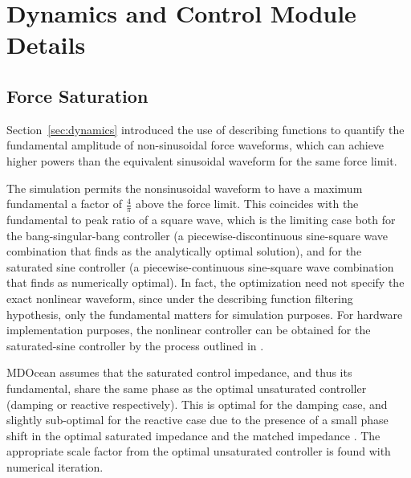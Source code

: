 \clearpage
\section{Dynamics and Control Module Details}

\subsection{Force Saturation}\label{sec:appendix-force-sat}
Section~\ref{sec:dynamics} introduced the use of describing functions to quantify the fundamental amplitude of non-sinusoidal force waveforms, which can achieve higher powers than the equivalent sinusoidal waveform for the same force limit.

The simulation permits the nonsinusoidal waveform to have a maximum fundamental a factor of $\frac{4}{\pi}$ above the force limit.
This coincides with the fundamental to peak ratio of a square wave, which is the limiting case both for the bang-singular-bang controller (a piecewise-discontinuous sine-square wave combination that \cite{hendrikx_optimal_2017} finds as the analytically optimal solution), and for the saturated sine controller (a piecewise-continuous sine-square wave combination that \cite{coe_initial_2020} finds as numerically optimal).
In fact, the optimization need not specify the exact nonlinear waveform, since under the describing function filtering hypothesis, only the fundamental matters for simulation purposes.
For hardware implementation purposes, the nonlinear controller can be obtained for the saturated-sine controller by the process outlined in \cite{mccabe_force-limited_2024}. 

MDOcean assumes that the saturated control impedance, and thus its fundamental, share the same phase as the optimal unsaturated controller (damping or reactive respectively).
This is optimal for the damping case, and slightly sub-optimal for the reactive case due to the presence of a small phase shift in the optimal saturated impedance and the matched impedance \cite{mccabe_force-limited_2024}.
The appropriate scale factor from the optimal unsaturated controller is found with numerical iteration. 

    
